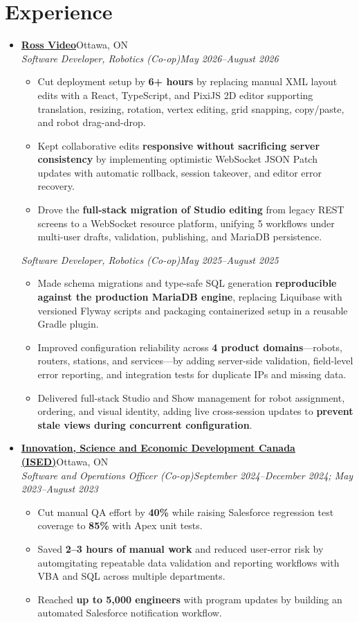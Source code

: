 \documentclass[letterpaper,11pt]{article}
\newcommand{\resumeItem}[1]{
  \item\small{
    {#1 \vspace{-2pt}}
  }
}
\newcommand{\resumeOrganization}[2]{
  \vspace{-2pt}\item
  \textbf{#1}\hfill #2\\[-1pt]
}
\newcommand{\resumeRole}[2]{
  \textit{\small #1}\hfill\textit{\small #2}\\[-4pt]
}
\newcommand{\resumeSubHeadingListStart}{\begin{itemize}[leftmargin=0.15in, label={}, itemsep=0pt]}
\newcommand{\resumeSubHeadingListEnd}{\end{itemize}}
\newcommand{\resumeItemListStart}{\begin{itemize}[leftmargin=0.22in, topsep=2pt, itemsep=0pt]}
\newcommand{\resumeItemListEnd}{\end{itemize}\vspace{-5pt}}
\begin{document}
\section{Experience}
\resumeSubHeadingListStart
\resumeOrganization
{\href{https://www.rossvideo.com}{Ross Video}}{Ottawa, ON}
\resumeRole
{Software Developer, Robotics (Co-op)}{May 2026--August 2026}
\resumeItemListStart
\resumeItem{Cut deployment setup by \textbf{6+ hours} by replacing manual XML layout edits with a React, TypeScript, and PixiJS 2D editor supporting translation, resizing, rotation, vertex editing, grid snapping, copy/paste, and robot drag-and-drop.}
\resumeItem{Kept collaborative edits \textbf{responsive without sacrificing server consistency} by implementing optimistic WebSocket JSON Patch updates with automatic rollback, session takeover, and editor error recovery.}
\resumeItem{Drove the \textbf{full-stack migration of Studio editing} from legacy REST screens to a WebSocket resource platform, unifying 5 workflows under multi-user drafts, validation, publishing, and MariaDB persistence.}
\resumeItemListEnd
\resumeRole
{Software Developer, Robotics (Co-op)}{May 2025--August 2025}
\resumeItemListStart
\resumeItem{Made schema migrations and type-safe SQL generation \textbf{reproducible against the production MariaDB engine}, replacing Liquibase with versioned Flyway scripts and packaging containerized setup in a reusable Gradle plugin.}
\resumeItem{Improved configuration reliability across \textbf{4 product domains}---robots, routers, stations, and services---by adding server-side validation, field-level error reporting, and integration tests for duplicate IPs and missing data.}
\resumeItem{Delivered full-stack Studio and Show management for robot assignment, ordering, and visual identity, adding live cross-session updates to \textbf{prevent stale views during concurrent configuration}.}
\resumeItemListEnd
\resumeOrganization
{\href{https://ised-isde.canada.ca/site/ised/en}{Innovation, Science and Economic Development Canada (ISED)}}{Ottawa, ON}
\resumeRole
{Software and Operations Officer (Co-op)}{September 2024--December 2024; May 2023--August 2023}
\resumeItemListStart
\resumeItem{Cut manual QA effort by \textbf{40\%} while raising Salesforce regression test coverage to \textbf{85\%} with Apex unit tests.}
\resumeItem{Saved \textbf{2--3 hours of manual work} and reduced user-error risk by automgitating repeatable data validation and reporting workflows with VBA and SQL across multiple departments.}
\resumeItem{Reached \textbf{up to 5,000 engineers} with program updates by building an automated Salesforce notification workflow.}
\resumeItemListEnd
\resumeSubHeadingListEnd
\end{document}
